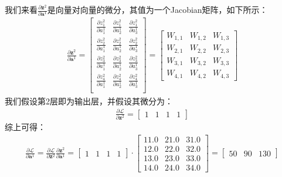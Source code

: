 我们来看$\frac{\partial{\boldsymbol{z}^{2}}}{\partial{\boldsymbol{a}^{1}}}$是向量对向量的微分，其值为一个Jacobian矩阵，如下所示：
\begin{equation}
\begin{aligned}
\frac{\partial{\boldsymbol{z}^{2}}} {\partial{\boldsymbol{a}^{1}}} = \begin{bmatrix}
	\frac{\partial{z^{2}_{1}}}{\partial{a^{1}_{1}}} & \frac{\partial{z^{2}_{1}}}{\partial{a^{1}_{2}}} & \frac{\partial{z^{2}_{1}}}{\partial{a^{1}_{3}}} \\
	\frac{\partial{z^{2}_{2}}}{\partial{a^{1}_{1}}} & \frac{\partial{z^{2}_{2}}}{\partial{a^{1}_{2}}} & \frac{\partial{z^{2}_{2}}}{\partial{a^{1}_{3}}} \\
	\frac{\partial{z^{2}_{3}}}{\partial{a^{1}_{1}}} & \frac{\partial{z^{2}_{3}}}{\partial{a^{1}_{2}}} & \frac{\partial{z^{2}_{3}}}{\partial{a^{1}_{3}}} \\
	\frac{\partial{z^{2}_{4}}}{\partial{a^{1}_{1}}} & \frac{\partial{z^{2}_{4}}}{\partial{a^{1}_{2}}} & \frac{\partial{z^{2}_{4}}}{\partial{a^{1}_{3}}} \\
\end{bmatrix} = \begin{bmatrix}
	W_{1,1} & W_{1,2} & W_{1,3} \\
	W_{2,1} & W_{2,2} & W_{2,3} \\
	W_{3,1} & W_{3,2} & W_{3,3} \\
	W_{4,1} & W_{4,2} & W_{4,3}
\end{bmatrix}
\end{aligned}
\label{chpZ01-zwa-pz-pa}
\end{equation}
我们假设第2层即为输出层，并假设其微分为：
\begin{equation}
\begin{aligned}
\frac{\partial{\mathcal{L}}} {\partial{\boldsymbol{z}^{2}}} = \begin{bmatrix}
	1 & 1 & 1 & 1
\end{bmatrix}
\end{aligned}
\label{chpZ01-zwa-pl-pz2}
\end{equation}
综上可得：
\begin{equation}
\begin{aligned}
\frac{\partial{\mathcal{L}}} {\partial{\boldsymbol{a}^{1}}} = \frac{\partial{\mathcal{L}}} {\partial{\boldsymbol{z}^{2}}} \frac{\partial{\boldsymbol{z}^{2}}} {\partial{\boldsymbol{a}^{1}}} =
\begin{bmatrix}
	1 & 1 & 1 & 1
\end{bmatrix} \cdot  \begin{bmatrix}
	11.0 & 21.0 & 31.0 \\
	12.0 & 22.0 & 32.0 \\
	13.0 & 23.0 & 33.0 \\
	14.0 & 24.0 & 34.0 
\end{bmatrix} = \begin{bmatrix}
	50 & 90 & 130
\end{bmatrix}
\end{aligned}
\label{chpZ01-zwa-pl-pa1}
\end{equation}
